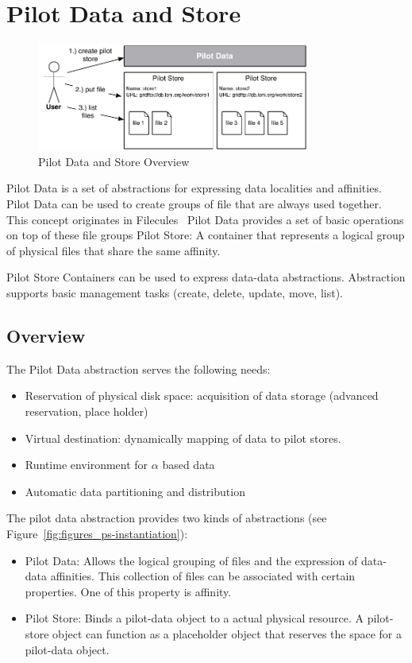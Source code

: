 \documentclass[]{article}
\begin{document}
\section{Pilot Data and Store}
\label{sec:pilot-data}
\begin{figure}[t]
    \centering
        \includegraphics[width=0.8\textwidth]{figures/pilotstore.pdf}
    \caption{Pilot Data and Store Overview}
    \label{fig:figures_pilotstore}
\end{figure}

Pilot Data is a set of abstractions for expressing data localities and
affinities. Pilot Data can be used to create groups of file that are always used
together. This concept originates in
Filecules~\cite{Doraimani:2008:FGS:1383422.1383429} Pilot Data provides a set of
basic operations on top of these file groups Pilot Store: A container that
represents a logical group of physical files that share the same affinity.

Pilot Store Containers can be used to express data-data abstractions. 
Abstraction supports basic management tasks (create, delete, update,
move, list). 

\subsection{Overview}

The Pilot Data abstraction serves the following needs:
\begin{itemize}
	\item Reservation of physical disk space: acquisition of data storage (advanced reservation, place holder)
	\item Virtual destination: dynamically mapping of data to pilot stores.
	\item Runtime environment for $\alpha$ based data
	\item Automatic data partitioning and distribution
\end{itemize}


The pilot data abstraction provides two kinds of abstractions (see Figure~\ref{fig:figures_ps-instantiation}):
\begin{itemize}
    \item Pilot Data: Allows the logical grouping of files and the expression of data-data affinities. This collection of files can be associated with certain properties. One of this property is affinity.
    
    \item Pilot Store: Binds a pilot-data object to a actual physical resource. A pilot-store object can function as a placeholder object that reserves the space for a pilot-data object.
\end{itemize}
\end{document}

